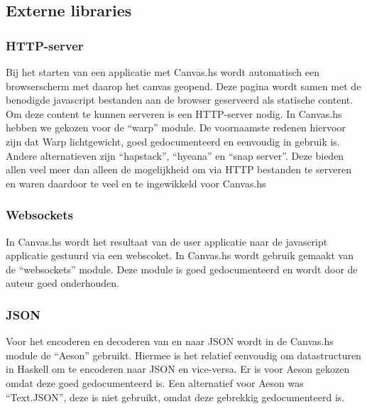 \subsection{Externe libraries}
\label{subsec:externe_libraries}

\subsubsection{HTTP-server}
Bij het starten van een applicatie met Canvas.hs wordt automatisch een browserscherm met daarop het canvas geopend. Deze pagina wordt samen met de benodigde javascript bestanden aan de browser geserveerd als statische content. Om deze content te kunnen serveren is een HTTP-server nodig. In Canvas.hs hebben we gekozen voor de ``warp'' module. De voornaamste redenen hiervoor zijn dat Warp lichtgewicht, goed gedocumenteerd en eenvoudig in gebruik is. Andere alternatieven zijn ``hapstack'', ``hyeana'' en ``snap server''. Deze bieden allen veel meer dan alleen de mogelijkheid om via HTTP bestanden te serveren en waren daardoor te veel en te ingewikkeld voor Canvas.hs

\subsubsection{Websockets}
In Canvas.hs wordt het resultaat van de user applicatie naar de javascript applicatie gestuurd via een webscoket. In Canvas.hs wordt gebruik gemaakt van de ``websockets'' module. Deze module is goed gedocumenteerd en wordt door de auteur goed onderhouden.

\subsubsection{JSON}
Voor het encoderen en decoderen van en naar JSON wordt in de Canvas.hs module de ``Aeson'' gebruikt. Hiermee is het relatief eenvoudig om datastructuren in Haskell om te encoderen naar JSON en vice-versa. Er is voor Aeson gekozen omdat deze goed gedocumenteerd is. Een alternatief voor Aeson was ``Text.JSON'', deze is niet gebruikt, omdat deze gebrekkig gedocumenteerd is.

